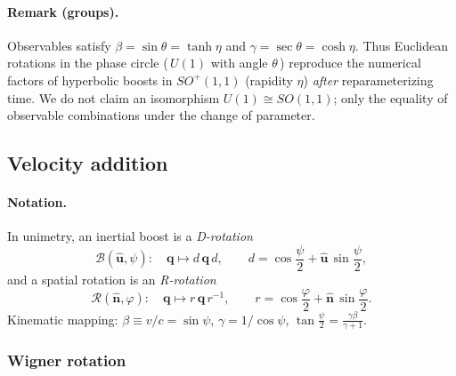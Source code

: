 \documentclass[11pt]{article}
\numberwithin{equation}{section}
\begin{document}
\paragraph{Remark (groups).} Observables satisfy $\beta=\sin\theta=\tanh\eta$ and $\gamma=\sec\theta=\cosh\eta$. Thus Euclidean rotations in the phase circle (\,$U(1)$ with angle $\theta$\,) reproduce the numerical factors of hyperbolic boosts in $SO^+(1,1)$ (rapidity $\eta$) \emph{after} reparameterizing time. We do not claim an isomorphism $U(1)\cong SO(1,1)$; only the equality of observable combinations under the change of parameter.


\subsection{Velocity addition}
\label{sec:vel-addition}

\paragraph{Notation.}
In unimetry, an inertial boost is a \emph{D-rotation}
\begin{equation}
\mathcal{B}(\hat{\mathbf u},\psi):\quad \mathbf q \mapsto d\,\mathbf q\,d,
\qquad
d=\cos\frac{\psi}{2}+\hat{\mathbf u}\,\sin\frac{\psi}{2},
\end{equation}
and a spatial rotation is an \emph{R-rotation}
\begin{equation}
\mathcal{R}(\hat{\mathbf n},\varphi):\quad \mathbf q \mapsto r\,\mathbf q\,r^{-1},
\qquad
r=\cos\frac{\varphi}{2}+\hat{\mathbf n}\,\sin\frac{\varphi}{2}.
\end{equation}
Kinematic mapping: $\beta\equiv v/c=\sin\psi$, $\gamma=1/\cos\psi$,
$\displaystyle \tan\frac{\psi}{2}=\frac{\gamma\beta}{\gamma+1}$.

\subsubsection{Wigner rotation}
\label{subsec:wigner}
\end{document}
